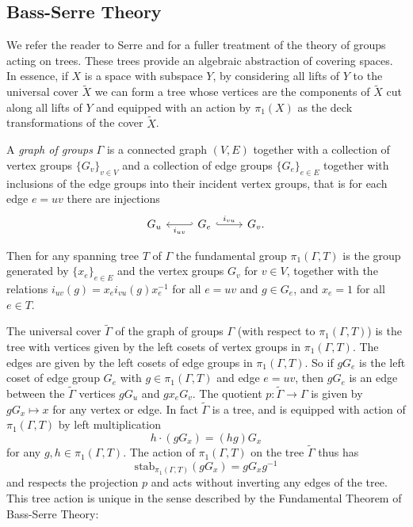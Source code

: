 \subsection{Bass-Serre Theory}

We refer the reader to Serre \cite{SerreJeanPierre2003T}
and  for a fuller treatment of the theory of groups acting on trees.
These trees provide an algebraic abstraction of covering spaces.
In essence, if $X$ is a space with subspace $Y$, by considering all lifts of $Y$ to the universal cover $\tilde X$ we can form a tree whose vertices are the components of $\tilde X$ cut along all lifts of $Y$ and equipped with an action by $\pi_1(X)$
as the deck transformations of the cover $\tilde X$.


A \emph{graph of groups} $\Gamma$
is a connected graph $(V,E)$ together with
a collection of vertex groups $\{G_v\}_{v \in V}$
and a collection of edge groups $\{G_e\}_{e \in E}$
together with inclusions of the edge groups into their incident vertex groups, that is for each edge $e=uv$ there are injections
$$
\begin{tikzcd}
G_u & G_e \arrow[l,hook',"i_{uv}"] \arrow[r,hook,"i_{vu}"] & G_v.
\end{tikzcd}
$$

Then for any spanning tree $T$ of $\Gamma$
the fundamental group $\pi_1(\Gamma,T)$
is the group generated by $\{x_e\}_{e\in E}$ and the vertex groups $G_v$ for $v \in V$,
together with the relations
$i_{uv}(g) = x_e i_{vu}(g) x_e^{-1}$ for all $e=uv$
and $g \in G_e$,
and $x_e=1$ for all $e \in T$.

The universal cover $\tilde \Gamma$ of the graph of groups $\Gamma$ (with respect to $\pi_1(\Gamma, T)$) is the tree
with vertices
given by the left cosets of vertex groups in $\pi_1(\Gamma, T)$.
The edges are given by the left cosets of edge groups in $\pi_1(\Gamma, T)$.
So if $gG_e$ is the left coset of edge group $G_e$ with $g \in \pi_1(\Gamma, T)$
and edge $e=uv$, then
$gG_e$ is an edge
between the $\tilde \Gamma$ vertices $gG_u$ and $gx_eG_v$.
The quotient $p: \tilde \Gamma \to \Gamma$
is given by $gG_x \mapsto x$ for any vertex or edge.
In fact $\tilde \Gamma$ is a tree,
and is
equipped with
action
of $\pi_1(\Gamma, T)$ by left multiplication
$$
h \cdot \left ( gG_x \right) = (hg) G_x
$$
for any $g,h \in \pi_1(\Gamma, T)$.
The action of $\pi_1(\Gamma, T)$ on the tree
$\tilde \Gamma$ thus has
$$
\mbox{stab}_{\pi_1(\Gamma, T)} \left ( gG_x \right )
=
gG_xg^{-1}
$$
and respects the projection $p$ and acts without inverting any edges of the tree.
This tree action is unique in the sense described by the Fundamental Theorem of Bass-Serre Theory:

